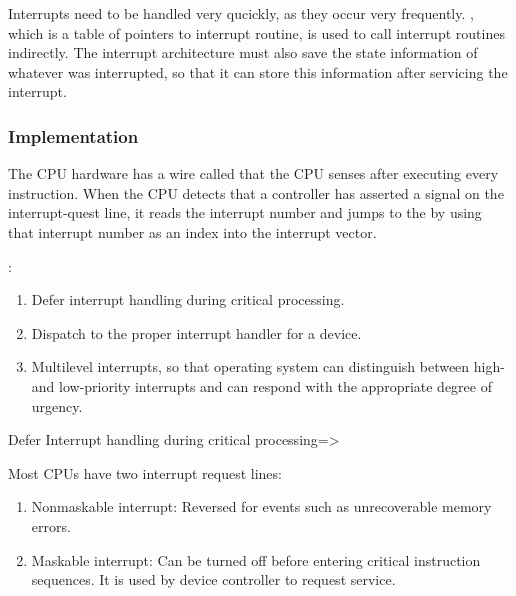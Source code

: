 Interrupts need to be handled very qucickly, as they occur very frequently. , which is a table of pointers to interrupt routine, is used to call interrupt routines indirectly. The interrupt architecture must also save the state information of whatever was interrupted, so that it can store this information after servicing the interrupt.

\subsubsection{Implementation}

\hf The CPU hardware has a wire called  that the CPU senses after executing every instruction. When the CPU detects that a controller has asserted a signal
on the interrupt-quest line, it reads the interrupt number and jumps to the  by using that interrupt number as an index into the interrupt vector.



:
\begin{enumerate}
	\item Defer interrupt handling during critical processing.
	\item Dispatch to the proper interrupt handler for a device.
	\item Multilevel interrupts, so that operating system can distinguish between high- and low-priority interrupts and can respond  with the appropriate degree of urgency.
\end{enumerate}


\begin{center}
Defer Interrupt handling during critical processing=>
\end{center}

Most CPUs have two interrupt request lines:
\begin{enumerate}
	\item Nonmaskable interrupt: Reversed for events such as unrecoverable memory errors.
	\item Maskable interrupt: Can be turned off before entering critical instruction sequences. It is used by device controller to request service.
\end{enumerate}



